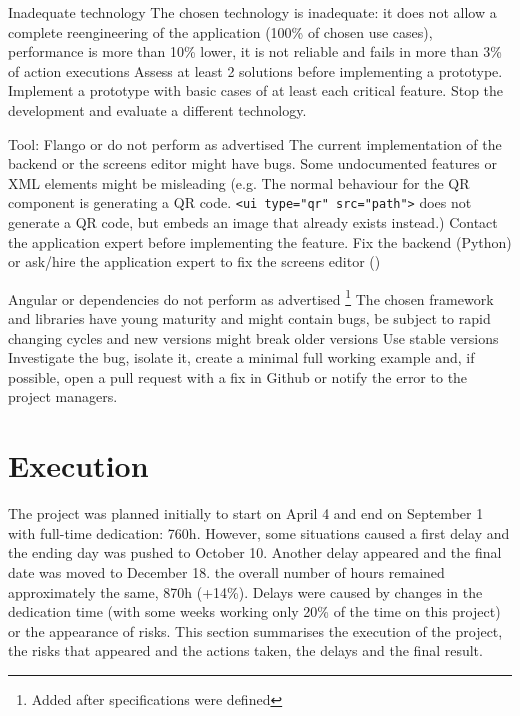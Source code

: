 \begin{risk}
{Inadequate technology}
{The chosen technology is inadequate: it does not allow a complete reengineering of the application (100\% of chosen use cases), performance is more than 10\% lower, it is not reliable and fails in more than 3\% of action executions}
{Assess at least 2 solutions before implementing a prototype. Implement a prototype with basic cases of at least each critical feature.}
{Stop the development and evaluate a different technology.}
\end{risk}

\begin{risk}
{Tool: Flango or \se do not perform as advertised}
{The current implementation of the backend or the screens editor might have bugs.
Some undocumented features or \ac{XML} elements might be misleading (e.g. The normal behaviour for the QR component is generating a QR code. \lstinline$<ui type="qr" src="path">$ does not generate a QR code, but embeds an image that already exists instead.) }
{Contact the application expert before implementing the feature.}
{Fix the backend (Python) or ask/hire the application expert to fix the screens editor (\flash)}
\end{risk}

\begin{risk}
{Angular or dependencies do not perform as advertised \footnote{Added after specifications were defined}}
{The chosen framework and libraries have young maturity and might contain bugs, be subject to rapid changing cycles and new versions might break older versions}
{Use stable versions}
{Investigate the bug, isolate it, create a minimal full working example and, if possible, open a pull request with a fix in Github or notify the error to the project managers.}
\end{risk}

\FloatBarrier

\section{Execution}
The project was planned initially to start on April 4 and end on September 1 with full-time dedication: 760h.
However, some situations caused a first delay and the ending day was pushed to October 10.
Another delay appeared and the final date was moved to December 18.
the overall number of hours remained approximately the same, 870h (+14\%).
Delays were caused by changes in the dedication time (with some weeks working only 20\% of the time on this project) or the appearance of risks.
This section summarises the execution of the project, the risks that appeared and the actions taken, the delays and the final result.

